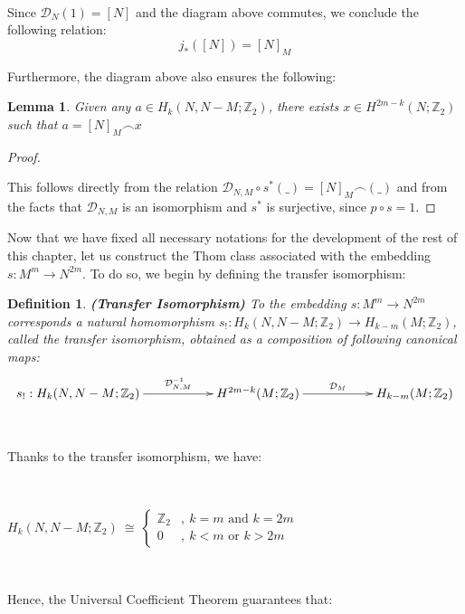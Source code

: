 \documentclass[12pt,oneside]{book}
\newtheorem{defi}   {Definition}[chapter]
\newtheorem{lem}    {Lemma}[chapter]
\newcommand{\Z}{\mathbb{Z}}
\newcommand{\ccap}{\frown}
\begin{document}
    \

    Since $\mathcal{D}_{N}(1)=[N]$ and the diagram above commutes, we conclude the following relation:
    $$ j_{*}([N])=[N]_{M} $$

    Furthermore, the diagram above also ensures the following:

    \begin{lem}\label{lema_tecnico_dualidades}
        Given any $a\in H_{k}(N,N-M;\Z_{2})$, there exists $x\in H^{2m-k}(N;\Z_{2})$ such that $a=[N]_{M}\ccap x$
    \end{lem}
    \begin{proof}

        \ 

        This follows directly from the relation $\mathcal{D}_{N,M}\circ s^{*}(\_)=[N]_{M}\ccap(\_)$ and from the facts that 
        $\mathcal{D}_{N,M}$ is an isomorphism and $s^{*}$ is surjective, since $p\circ s=1$.

    \end{proof}

    Now that we have fixed all necessary notations for the development of the rest of this chapter, let us construct the Thom 
    class associated with the embedding $s:M^{m}\to N^{2m}$. To do so, we begin by defining the transfer isomorphism:

    \begin{defi}{\bf (Transfer Isomorphism)}
        To the embedding $s:M^{m}\to N^{2m}$ corresponds a natural homomorphism $s_{!}:H_{k}(N,N-M;\Z_{2})\to H_{k-m}(M;\Z_{2})$, called the 
        transfer isomorphism, obtained as a composition of following canonical maps:
        $$ \xymatrix @C=0.5cm {
        s_{!}:H_{k}(N,N-M;\Z_{2}) \ar[rrr]^-{\mathcal{D}^{-1}_{N,M}} &&& H^{2m-k}(M;\Z_{2}) \ar[rrr]^-{\mathcal{D}_{M}} &&& H_{k-m}(M;\Z_{2})
        } $$
    \end{defi}

    \

    Thanks to the transfer isomorphism, we have:

    \

    $H_{k}(N,N-M;\Z_{2}) \ \cong \ \left\{\begin{array}{cl}
    	\Z_{2} & , \ k=m \text{ and } k=2m \\
    	0      & , \ k<m \text{ or } k>2m
    \end{array}\right.$

    \

    Hence, the Universal Coefficient Theorem guarantees that:
\end{document}
